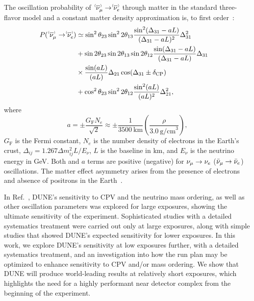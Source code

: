 The oscillation probability of $\;\nu^{\bracketbar}_\mu \rightarrow \nu^{\bracketbar}_e$ through matter in the standard three-flavor model and a constant matter density approximation is, to first order~\cite{Nunokawa:2007qh}:
\begin{equation}
  \begin{aligned}
    P(\;\nu^{\bracketbar}_\mu \rightarrow \nu^{\bracketbar}_e) & \simeq \sin^2 \theta_{23} \sin^2 2 \theta_{13} 
    \frac{ \sin^2(\Delta_{31} - aL)}{(\Delta_{31}-aL)^2} \Delta_{31}^2 \\
    & + \sin 2 \theta_{23} \sin 2 \theta_{13} \sin 2 \theta_{12}\frac{ \sin(\Delta_{31} - aL)}{(\Delta_{31}-aL)} \Delta_{31} \\
    &\times \frac{\sin(aL)}{(aL)} \Delta_{21} \cos (\Delta_{31} \pm \deltacp) & \\
    & + \cos^2 \theta_{23} \sin^2 2 \theta_{12} \frac {\sin^2(aL)}{(aL)^2} \Delta_{21}^2,
  \end{aligned}
  \label{eqn:appprob}
\end{equation}
where
\begin{equation*}
  a = \pm \frac{G_{\mathrm{F}}N_e}{\sqrt{2}} \approx \pm\frac{1}{3500~\mathrm{km}}\left(\frac{\rho}{3.0~\mathrm{g/cm}^{3}}\right),
\end{equation*}
$G_{\mathrm{F}}$ is the Fermi constant, $N_e$ is the number density of electrons in the Earth's crust, $\Delta_{ij} = 1.267 \Delta m^2_{ij} L/E_\nu$, $L$ is the baseline in km, and $E_\nu$ is the neutrino energy in GeV. 
Both \deltacp and $a$ terms are positive (negative) for $\nu_\mu \to \nu_e$ ($\bar\nu_\mu \to \bar\nu_e$) oscillations. The matter effect asymmetry arises from the presence of electrons and absence of positrons in the Earth~\cite{Wolfenstein:1977ue,Mikheev:1986gs}.

In Ref.~\cite{Abi:2020qib}, DUNE's sensitivity to CPV and the neutrino mass ordering, as well as other oscillation parameters was explored for large exposures, showing the ultimate sensitivity of the experiment. Sophisticated studies with a detailed systematics treatment were carried out only at large exposures, along with simple studies that showed DUNE's expected sensitivity for lower exposures. In this work, we explore DUNE's sensitivity at low exposures further, with a detailed systematics treatment, and an investigation into how the run plan may be optimized to enhance sensitivity to CPV and/or mass ordering. We show that DUNE will produce world-leading results at relatively short exposures, which highlights the need for a highly performant near detector complex from the beginning of the experiment. 

